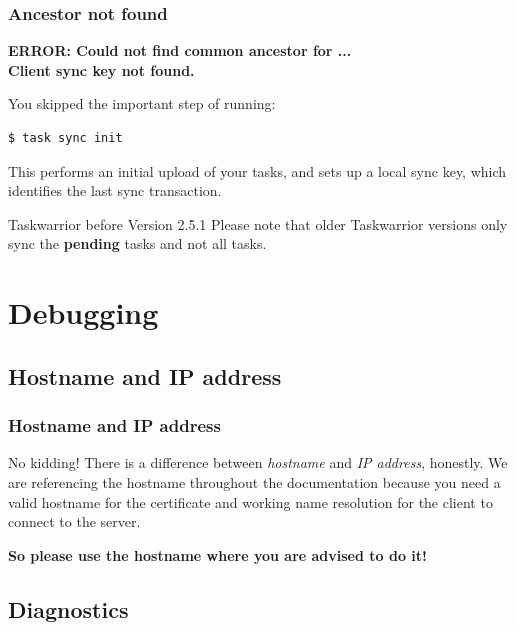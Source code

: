 \documentclass[t,handout]{beamer}
\begin{document}
\begin{frame}[fragile]\frametitle{Ancestor not found}
    \vfill
    \textbf{ERROR: Could not find common ancestor for ...\\
Client sync key not found.}

    You skipped the important step of running:
    \begin{lstlisting}
$ task sync init\end{lstlisting}

    This performs an initial upload of your tasks, and sets up a local sync key, which identifies the last sync transaction.

    \begin{alertblock}{Taskwarrior before Version 2.5.1}
        Please note that older Taskwarrior versions only sync the \textbf{pending} tasks and not all tasks.
    \end{alertblock}
\end{frame}

\section{Debugging}

\subsection{Hostname and IP address}

\begin{frame}[fragile]\frametitle{Hostname and IP address}
    \vfill
    \begin{alertblock}{No kidding!}
        There is a difference between \textit{hostname} and \textit{IP address}, honestly. We are referencing the hostname throughout the documentation because you need a valid hostname for the certificate and working name resolution for the client to connect to the server.

        \textbf{So please use the hostname where you are advised to do it!}
    \end{alertblock}
\end{frame}

\subsection{Diagnostics}
\end{document}
